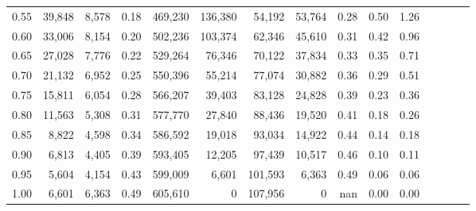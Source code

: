\begin{tabular}{rrrcrrrrrrrrrrr}
0.55 &  39,848 &  8,578 &                                       0.18 &  469,230 &  136,380 &   54,192 &   53,764 &  0.28 &  0.50 &                         1.26 \\
0.60 &  33,006 &  8,154 &                                       0.20 &  502,236 &  103,374 &   62,346 &   45,610 &  0.31 &  0.42 &                         0.96 \\
0.65 &  27,028 &  7,776 &                                       0.22 &  529,264 &   76,346 &   70,122 &   37,834 &  0.33 &  0.35 &                         0.71 \\
0.70 &  21,132 &  6,952 &                                       0.25 &  550,396 &   55,214 &   77,074 &   30,882 &  0.36 &  0.29 &                         0.51 \\
0.75 &  15,811 &  6,054 &                                       0.28 &  566,207 &   39,403 &   83,128 &   24,828 &  0.39 &  0.23 &                         0.36 \\
0.80 &  11,563 &  5,308 &                                       0.31 &  577,770 &   27,840 &   88,436 &   19,520 &  0.41 &  0.18 &                         0.26 \\
0.85 &   8,822 &  4,598 &                                       0.34 &  586,592 &   19,018 &   93,034 &   14,922 &  0.44 &  0.14 &                         0.18 \\
0.90 &   6,813 &  4,405 &                                       0.39 &  593,405 &   12,205 &   97,439 &   10,517 &  0.46 &  0.10 &                         0.11 \\
0.95 &   5,604 &  4,154 &                                       0.43 &  599,009 &    6,601 &  101,593 &    6,363 &  0.49 &  0.06 &                         0.06 \\
1.00 &   6,601 &  6,363 &                                       0.49 &  605,610 &        0 &  107,956 &        0 &   nan &  0.00 &                         0.00 \\
\bottomrule
\end{tabular}
